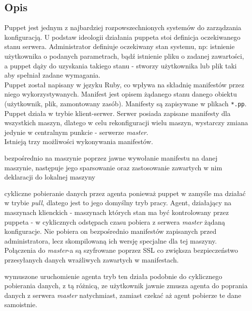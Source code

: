\subsection{Opis}
\label{sec:puppet_opis}
Puppet jest jednym z najbardziej rozpowszechnionych systemów do zarządzania konfiguracją.
U podstaw ideologii działania puppeta stoi definicja oczekiwanego stanu serwera.
Administrator definiuje oczekiwany stan systemu, np: istnienie użytkownika o podanych parametrach, bądź istnienie pliku o zadanej zawartości, a puppet dąży do uzyskania takiego stanu - stworzy użytkownika lub plik taki aby spełniał zadane wymagania.\\
Puppet został napisany w języku Ruby, co wpływa na składnię manifestów przez niego wykorzystywanych.
Manifest jest opisem żądanego stanu danego obiektu (użytkownik, plik, zamontowany zasób).
Manifesty są zapisywane w plikach \texttt{*.pp}.\\
Puppet działa w trybie klient-serwer.
Serwer posiada zapisane manifesty dla wszystkich maszyn, dlatego w celu rekonfiguracji wielu maszyn, wystarczy zmiana jedynie w centralnym punkcie - serwerze \textit{master}.\\
Istnieją trzy możliwości wykonywania manifestów.
\begin{description}
	\item{bezpośrednio na maszynie}
		poprzez jawne wywołanie manifestu na danej maszynie, następuje jego sparsowanie oraz zastosowanie zawartych w nim deklaracji do lokalnej maszyny
	\item{cykliczne pobieranie danych przez agenta}
		ponieważ puppet w zamyśle ma działać w trybie \textit{pull}, dlatego jest to jego domyślny tryb pracy.
		Agent, działający na maszynach klienckich - maszynach których stan ma być kontrolowany przez puppeta - w cyklicznych odstępach czasu pobiera z serwera \textit{master} żądaną konfiguracje.
		Nie pobiera on bezpośrednio manifestów zapisanych przed administratora, lecz skompilowaną ich wersję specjalne dla tej maszyny.\\
		Połączenia do \textit{master}-a są szyfrowane poprzez SSL co zwiększa bezpieczeństwo przesyłanych danych wrażliwych zawartych w manifestach.
	\item{wymuszone uruchomienie agenta}
		tryb ten działa podobnie do cyklicznego pobierania danych, z tą różnicą, ze użytkownik jawnie zmusza agenta do poprania danych z serwera \textit{master} natychmiast, zamiast czekać aż agent pobierze te dane samoistnie.
\end{description}
